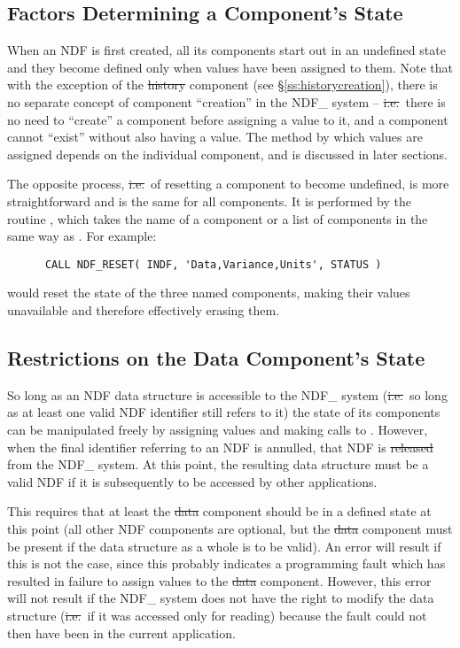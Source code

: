 \subsection{\label{ss:reset}Factors Determining a Component's State}

When an NDF is first created, all its components start out in an
undefined state and they become defined only when values have been
assigned to them.  Note that with the exception of the \st{history\/}
component (see \S\ref{ss:historycreation}), there is no separate
concept of component ``creation'' in the NDF\_ system --
\st{i.e.}\ there is no need to ``create'' a component before assigning
a value to 
it, and a component cannot ``exist'' without also having a value.  The
method by which values are assigned depends on the individual
component, and is discussed in later sections.

The opposite process, \st{i.e.}\ of resetting a component to become
undefined, is more straightforward and is the same for all components. 
It is performed by the routine , which takes the name of a
component or a list of components in the same way as . 
For example:

\small
\begin{verbatim}
      CALL NDF_RESET( INDF, 'Data,Variance,Units', STATUS )
\end{verbatim}
\normalsize

would reset the state of the three named components, making their values 
unavailable and therefore effectively erasing them.

\subsection{Restrictions on the Data Component's State}

So long as an NDF data structure is accessible to the NDF\_ system
(\st{i.e.}\ so long as at least one valid NDF identifier still refers
to it) the 
state of its components can be manipulated freely by assigning values and
making calls to . 
However, when the final identifier referring to an NDF is annulled, that NDF
is \st{released\/} from the NDF\_ system. 
At this point, the resulting data structure must be a valid NDF if it is
subsequently to be accessed by other applications.

This requires that at least the \st{data\/} component should be in a defined
state at this point (all other NDF components are optional, but the
\st{data\/} component must be present if the data structure as a whole
is to be 
valid). 
An error will result if this is not the case, since this probably indicates
a programming fault which has resulted in failure to assign values to
the \st{data\/} component.  
However, this error will not result if the NDF\_ system does not have the
right to modify the data structure (\st{i.e.}\ if it was accessed only for
reading) because the fault could not then have been in the current application. 



